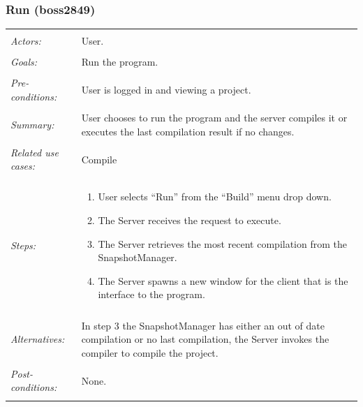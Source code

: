 \documentclass[11pt]{article}
\begin{document}
\subsubsection{Run (boss2849)}
\begin{tabular}{ p{2cm} p{12cm} }
 \hline
 \\
 \textit{Actors:} & User. \\ 
 \\
 \textit{Goals:} & Run the program. \\
 \\
 \textit{Pre-conditions:} & User is logged in and viewing a project. \\
 \\
 \textit{Summary:} & User chooses to run the program and the server compiles it or executes the last compilation result if no changes. \\
 \\
 \textit{Related use cases:} & Compile \\ 
 \\
 \textit{Steps:} & \begin{enumerate}
  \item User selects ``Run'' from the ``Build'' menu drop down.
  \item The Server receives the request to execute.
  \item The Server retrieves the most recent compilation from the SnapshotManager.
  \item The Server spawns a new window for the client that is the interface to the program.
 \end{enumerate} \\
 \\
 \textit{Alternatives:} & In step 3 the SnapshotManager has either an out of date compilation or no last compilation, the Server invokes the compiler to compile the project. \\
 \\
 \textit{Post-conditions:} & None. \\
 \\
\hline
\end{tabular}
\end{document}

